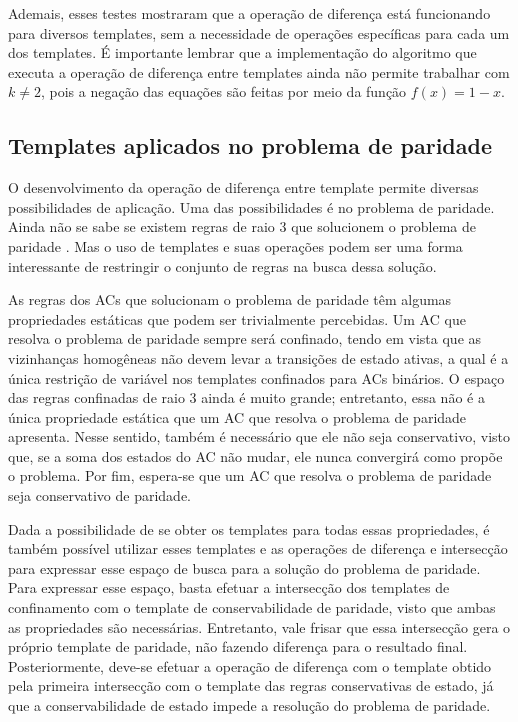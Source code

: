 Ademais, esses testes mostraram que a operação de diferença está funcionando para diversos templates, sem a necessidade de operações específicas para cada um dos templates. É importante lembrar que a implementação do algoritmo que executa a operação de diferença entre templates ainda não permite trabalhar com $k\neq 2$, pois a negação das equações são feitas por meio da função $f(x) = 1 - x$.

\subsection{Templates aplicados no problema de paridade}
O desenvolvimento da operação de diferença entre template permite diversas possibilidades de aplicação.
Uma das possibilidades é no problema de paridade. 
Ainda não se sabe se existem regras de raio 3 que solucionem o problema de paridade \cite{Betel2013}. 
Mas o uso de templates e suas operações podem ser uma forma interessante de restringir o conjunto de regras na busca dessa solução.

As regras dos ACs que solucionam o problema de paridade têm algumas propriedades estáticas que podem ser trivialmente percebidas. 
Um AC que resolva o problema de paridade sempre será confinado, tendo em vista que as vizinhanças homogêneas não devem levar a transições de estado ativas, a qual é a única restrição de variável nos templates confinados para ACs binários. 
O espaço das regras confinadas de raio 3 ainda é muito grande; entretanto, essa não é a única propriedade estática que um AC que resolva o problema de paridade apresenta.  Nesse sentido, também é necessário que ele não seja conservativo, visto que, se a soma dos estados do AC não mudar, ele nunca convergirá como propõe o problema. 
Por fim, espera-se que um AC que resolva o problema de paridade seja conservativo de paridade.

Dada a possibilidade de se obter os templates para todas essas propriedades, é também possível utilizar esses templates e as operações de diferença e intersecção para expressar esse espaço de busca para a solução do problema de paridade.
Para expressar esse espaço, basta efetuar a intersecção dos templates de confinamento com o template de conservabilidade de paridade, visto que ambas as propriedades são necessárias. Entretanto, vale frisar que essa intersecção gera o próprio template de paridade, não fazendo diferença para o resultado final.
Posteriormente, deve-se efetuar a operação de diferença com o template obtido pela primeira intersecção com o template das regras conservativas de estado, já que a conservabilidade de estado impede a resolução do problema de paridade.


